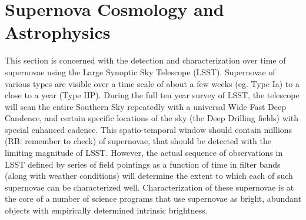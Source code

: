 %
%
%
%
%
%
%

\section{Supernova Cosmology and Astrophysics}
\def\secname{supernovae}\label{sec:\secname}



This section is concerned with the detection and characterization over time of
supernovae using the Large Synoptic Sky Telescope (LSST). Supernovae of various
types are visible over a time scale of about a few weeks (eg. Type Ia) to a
 close to a year (Type IIP). During the full ten year survey of LSST, the
telescope will scan the entire Southern Sky repeatedly with a universal Wide Fast Deep
 Candence, and certain specific locations of the sky (the Deep Drilling fields)
with special enhanced cadence. This spatio-temporal window should contain
millions (RB: remember to check) of supernovae, that should be detected with the
 limiting magnitude of LSST. However, the actual sequence of observations in LSST
defined by series of field pointings as a function of time in filter bands
 (along with weather conditions) will determine the extent to which each of such
supernovae can be characterized well. Characterization of these supernovae is at
 the core of a number of science programs that use supernovae as bright, abundant
 objects with empirically determined intrinsic brightness.

